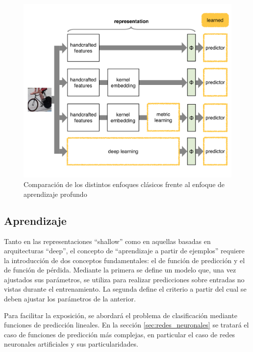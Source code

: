 \documentclass[a4paper,11pt,spanish]{book}
\begin{document}
	\begin{figure}[h]
	  \begin{center}
		  \includegraphics[width=0.9\linewidth]{./img/vedaldi_shallow_deep.pdf}
	  \caption{Comparación de los distintos enfoques clásicos frente al enfoque de aprendizaje profundo}
	  \label{fig:shallow_deep}
	  \end{center}
	\end{figure}

        \subsection{Aprendizaje} \label{sec:aprendizaje}

	  Tanto en las representaciones ``shallow'' como en aquellas  basadas en arquitecturas ``deep'', el concepto de ``aprendizaje a
          partir de ejemplos'' requiere la introducción de dos conceptos fundamentales: el de función de predicción y el de función de pérdida. 
          Mediante la primera se define un modelo que, una vez ajustados sus parámetros, se utiliza para realizar predicciones sobre entradas no vistas durante el 
          entrenamiento. La segunda define el criterio a partir del cual se deben ajustar los parámetros de la anterior. 
          
          Para facilitar la exposición, se abordará el problema de clasificación mediante funciones de predicción lineales. 
          En la sección \ref{sec:redes_neuronales} se tratará el caso de funciones de predicción más complejas, en particular el caso de redes neuronales artificiales y
          sus particularidades.
\end{document}
